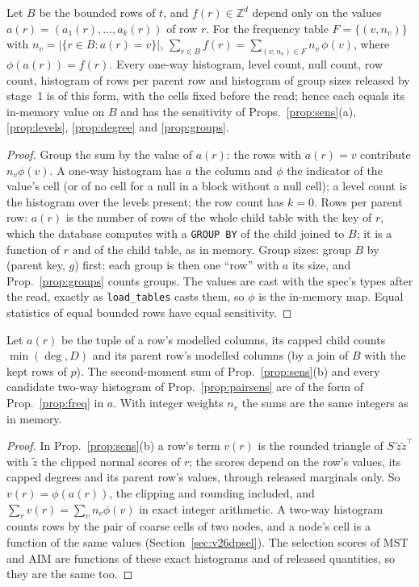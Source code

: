 \setcounter{proposition}{1760}
\begin{proposition}\label{prop:freq}
Let $B$ be the bounded rows of $t$, and $f(r)\in\mathbb{Z}^d$ depend only on the values $a(r)=(a_1(r),\dots,a_k(r))$ of row $r$. For the frequency table $F=\{(v,n_v)\}$ with $n_v=|\{r\in B: a(r)=v\}|$, $\sum_{r\in B}f(r)=\sum_{(v,n_v)\in F}n_v\,\phi(v)$, where $\phi(a(r))=f(r)$. Every one-way histogram, level count, null count, row count, histogram of rows per parent row and histogram of group sizes released by stage~1 is of this form, with the cells fixed before the read; hence each equals its in-memory value on $B$ and has the sensitivity of Props.~\ref{prop:sens}(a), \ref{prop:levels}, \ref{prop:degree} and \ref{prop:groups}.
\end{proposition}
\begin{proof}
Group the sum by the value of $a(r)$: the rows with $a(r)=v$ contribute $n_v\phi(v)$. A one-way histogram has $a$ the column and $\phi$ the indicator of the value's cell (or of no cell for a null in a block without a null cell); a level count is the histogram over the levels present; the row count has $k=0$. Rows per parent row: $a(r)$ is the number of rows of the whole child table with the key of $r$, which the database computes with a \texttt{GROUP BY} of the child joined to $B$; it is a function of $r$ and of the child table, as in memory. Group sizes: group $B$ by (parent key, $g$) first; each group is then one ``row'' with $a$ its size, and Prop.~\ref{prop:groups} counts groups. The values are cast with the spec's types after the read, exactly as \texttt{load\_tables} casts them, so $\phi$ is the in-memory map. Equal statistics of equal bounded rows have equal sensitivity.
\end{proof}

\setcounter{proposition}{1761}
\begin{proposition}\label{prop:joint}
Let $a(r)$ be the tuple of a row's modelled columns, its capped child counts $\min(\deg,D)$ and its parent row's modelled columns (by a join of $B$ with the kept rows of $p$). The second-moment sum of Prop.~\ref{prop:sens}(b) and every candidate two-way histogram of Prop.~\ref{prop:pairsens} are of the form of Prop.~\ref{prop:freq} in $a$. With integer weights $n_v$ the sums are the same integers as in memory.
\end{proposition}
\begin{proof}
In Prop.~\ref{prop:sens}(b) a row's term $v(r)$ is the rounded triangle of $S\,\tilde z\tilde z^\top$ with $\tilde z$ the clipped normal scores of $r$; the scores depend on the row's values, its capped degrees and its parent row's values, through released marginals only. So $v(r)=\phi(a(r))$, the clipping and rounding included, and $\sum_r v(r)=\sum_v n_v\phi(v)$ in exact integer arithmetic. A two-way histogram counts rows by the pair of coarse cells of two nodes, and a node's cell is a function of the same values (Section~\ref{sec:v26dpsel}). The selection scores of MST and AIM are functions of these exact histograms and of released quantities, so they are the same too.
\end{proof}

